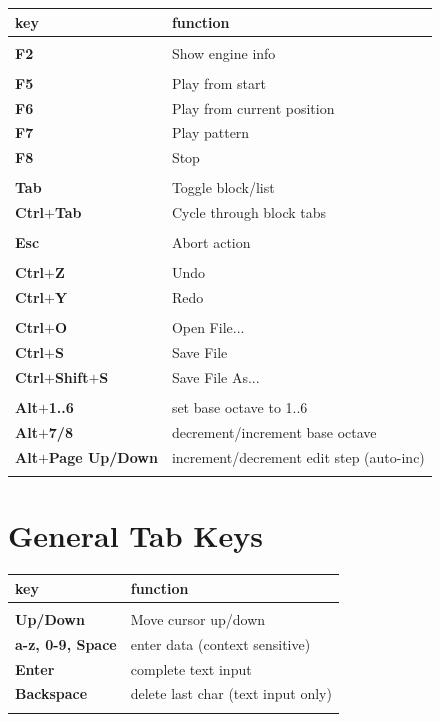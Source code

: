 \documentclass[12pt]{report}	%
\begin{document}
\begin{longtable}{p{} p{} }
\textbf{key} & \textbf{function} \\
\hline
\\
\textbf{F2} & Show engine info \\
\\
\textbf{F5} & Play from start \\
\textbf{F6} & Play from current position \\
\textbf{F7} & Play pattern \\
\textbf{F8} & Stop \\
\\
\textbf{Tab} & Toggle block/list \\
\textbf{Ctrl\(\bm{+}\)Tab} & Cycle through block tabs \\
\\
\textbf{Esc} & Abort action \\
\\
\textbf{Ctrl\(\bm{+}\)Z} & Undo \\
\textbf{Ctrl\(\bm{+}\)Y} & Redo \\
\\
\textbf{Ctrl\(\bm{+}\)O} & Open File... \\
\textbf{Ctrl\(\bm{+}\)S} & Save File \\
\textbf{Ctrl\(\bm{+}\)Shift\(\bm{+}\)S} & Save File As... \\
\\
\textbf{Alt\(\bm{+}\)1..6} & set base octave to 1..6 \\
\textbf{Alt\(\bm{+}\)7/8} & decrement/increment base octave \\
\textbf{Alt\(\bm{+}\)Page Up/Down} & increment/decrement edit step (auto-inc) \\
\\
\end{longtable}


\section{General Tab Keys}

\begin{longtable}{p{} p{} }
\textbf{key} & \textbf{function} \\
\hline
\\
\textbf{Up/Down} & Move cursor up/down \\
\textbf{a-z, 0-9, Space} & enter data (context sensitive) \\
\textbf{Enter} & complete text input \\
\textbf{Backspace} & delete last char (text input only) \\
\\
\end{longtable}
\end{document}

